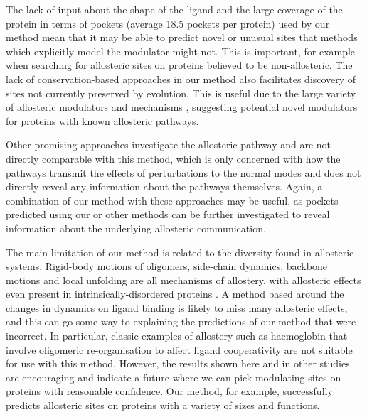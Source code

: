 The lack of input about the shape of the ligand and the large coverage of the protein in terms of pockets (average 18.5 pockets per protein) used by our method mean that it may be able to predict novel or unusual sites that methods which explicitly model the modulator might not.
This is important, for example when searching for allosteric sites on proteins believed to be non-allosteric.
The lack of conservation-based approaches in our method also facilitates discovery of sites not currently preserved by evolution.
This is useful due to the large variety of allosteric modulators \cite{Wang2012} and mechanisms \cite{Motlagh2014}, suggesting potential novel modulators for proteins with known allosteric pathways.

Other promising approaches \cite{Demerdash2009, Kidd2009, Kaya2013} investigate the allosteric pathway and are not directly comparable with this method, which is only concerned with how the pathways transmit the effects of perturbations to the normal modes and does not directly reveal any information about the pathways themselves.
Again, a combination of our method with these approaches may be useful, as pockets predicted using our or other methods can be further investigated to reveal information about the underlying allosteric communication.

The main limitation of our method is related to the diversity found in allosteric systems.
Rigid-body motions of oligomers, side-chain dynamics, backbone motions and local unfolding are all mechanisms of allostery, with allosteric effects even present in intrinsically-disordered proteins \cite{Motlagh2014}.
A method based around the changes in dynamics on ligand binding is likely to miss many allosteric effects, and this can go some way to explaining the predictions of our method that were incorrect.
In particular, classic examples of allostery such as haemoglobin that involve oligomeric re-organisation to affect ligand cooperativity are not suitable for use with this method.
However, the results shown here and in other studies are encouraging and indicate a future where we can pick modulating sites on proteins with reasonable confidence.
Our method, for example, successfully predicts allosteric sites on proteins with a variety of sizes and functions.
